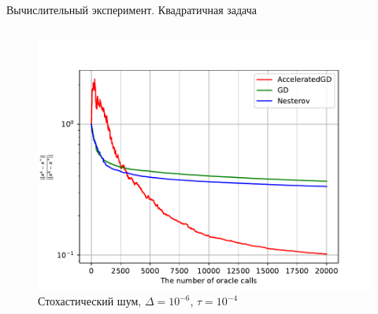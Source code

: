 \documentclass{beamer}
\begin{document}
\begin{frame}{Вычислительный эксперимент. Квадратичная задача}
\begin{columns}[c]
    \begin{figure}
    \includegraphics[width=1.0\textwidth]{Stochastic_quadratic_AGD_GD_Nesterov_18.pdf}
        \caption*{Стохастический шум, $\Delta = 10^{-6}$, $\tau = 10^{-4}$}
    \end{figure}
\end{columns}
\end{frame}
\end{document}
